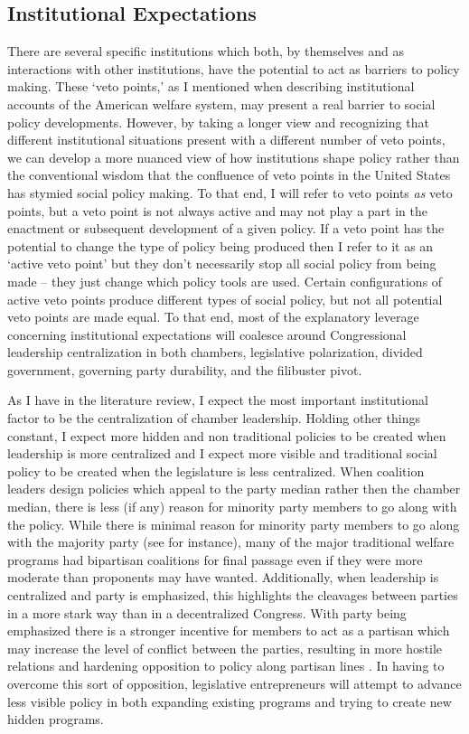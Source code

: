 \documentclass[12pt]{article}
\begin{document}
\subsection{Institutional Expectations}
There are several specific institutions which both, by themselves and as interactions with other institutions, have the potential to act as barriers to policy making. These `veto points,' as I mentioned when describing institutional accounts of the American welfare system, may present a real barrier to social policy developments. However, by taking a longer view and recognizing that different institutional situations present with a different number of veto points, we can develop a more nuanced view of how institutions shape policy rather than the conventional wisdom that the confluence of veto points in the United States has stymied social policy making. To that end, I will refer to veto points \emph{as} veto points, but a veto point is not always active and may not play a part in the enactment or subsequent development of a given policy. If a veto point has the potential to change the type of policy being produced then I refer to it as an `active veto point' but they don't necessarily stop all social policy from being made -- they just change which policy tools are used. Certain configurations of active veto points produce different types of social policy, but not all potential veto points are made equal. To that end, most of the explanatory leverage concerning institutional expectations will coalesce around Congressional leadership centralization in both chambers, legislative polarization, divided government, governing party durability, and the filibuster pivot.

As I have in the literature review, I expect the most important institutional factor to be the centralization of chamber leadership. Holding other things constant, I expect more hidden and non traditional policies to be created when leadership is more centralized and I expect more visible and traditional social policy to be created when the legislature is less centralized. When coalition leaders design policies which appeal to the party median rather then the chamber median, there is less (if any) reason for minority party members to go along with the policy. While there is minimal reason for minority party members to go along with the majority party (see \citet{cox2004} for instance), many of the major traditional welfare programs had bipartisan coalitions for final passage even if they were more moderate than proponents may have wanted. Additionally, when leadership is centralized and party is emphasized, this highlights the cleavages between parties in a more stark way than in a decentralized Congress. With party being emphasized there is a stronger incentive for members to act as a partisan which may increase the level of conflict between the parties, resulting in more hostile relations and hardening opposition to policy along partisan lines \citep{lee2009}. In having to overcome this sort of opposition, legislative entrepreneurs will attempt to advance less visible policy in both expanding existing programs and trying to create new hidden programs. 
\end{document}
